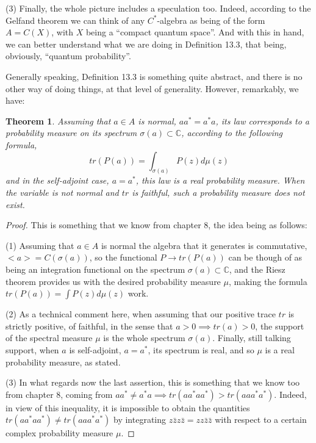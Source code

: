 \documentclass[12pt]{amsbook}
\newtheorem{theorem}{Theorem}[chapter]
\begin{document}
\bigskip

(3) Finally, the whole picture includes a speculation too. Indeed, according to the Gelfand theorem we can think of any $C^*$-algebra as being of the form $A=C(X)$, with $X$ being a ``compact quantum space''. And with this in hand, we can better understand what we are doing in Definition 13.3, that being, obviously, ``quantum probability''.

\bigskip

Generally speaking, Definition 13.3 is something quite abstract, and there is no other way of doing things, at that level of generality. However, remarkably, we have:


\begin{theorem}
Assuming that $a\in A$ is normal, $aa^*=a^*a$, its law corresponds to a probability measure on its spectrum $\sigma(a)\subset\mathbb C$, according to the following formula,
$$tr(P(a))=\int_{\sigma(a)}P(z)d\mu(z)$$
and in the self-adjoint case, $a=a^*$, this law is a real probability measure. When the variable is not normal and $tr$ is faithful, such a probability measure does not exist.
\end{theorem}

\begin{proof}
This is something that we know from chapter 8, the idea being as follows:

\medskip

(1) Assuming that $a\in A$ is normal the algebra that it generates is commutative, $<a>=C(\sigma(a))$, so the functional $P\to tr(P(a))$ can be though of as being an integration functional on the spectrum $\sigma(a)\subset\mathbb C$, and the Riesz theorem provides us with the desired probability measure $\mu$, making the formula $tr(P(a))=\int P(z)d\mu(z)$ work.

\medskip

(2) As a technical comment here, when assuming that our positive trace $tr$ is strictly positive, of faithful, in the sense that $a>0\implies tr(a)>0$, the support of the spectral measure $\mu$ is the whole spectrum $\sigma(a)$. Finally, still talking support, when $a$ is self-adjoint, $a=a^*$, its spectrum is real, and so $\mu$ is a real probability measure, as stated.

\medskip

(3) In what regards now the last assertion, this is something that we know too from chapter 8, coming from $aa^*\neq a^*a\implies tr(aa^*aa^*)>tr(aaa^*a^*)$. Indeed, in view of this inequality, it is impossible to obtain the quantities $tr(aa^*aa^*)\neq tr(aaa^*a^*)$ by integrating $z\bar{z}z\bar{z}=zz\bar{z}\bar{z}$ with respect to a certain complex probability measure $\mu$.
\end{proof}
\end{document}
